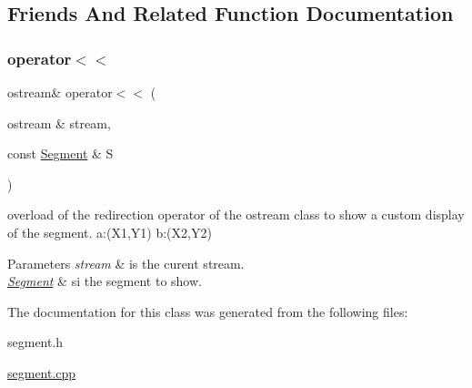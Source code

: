 \subsection{Friends And Related Function Documentation}
\hypertarget{class_segment_a494b19a0304a0778bcfb0303f33aec02}{}\label{class_segment_a494b19a0304a0778bcfb0303f33aec02} 
\subsubsection{\texorpdfstring{operator$<$$<$}{operator<<}}
{\footnotesize\ttfamily ostream\& operator$<$$<$ (\begin{DoxyParamCaption}\item[{ostream \&}]{stream,  }\item[{const \hyperlink{class_segment}{Segment} \&}]{S }\end{DoxyParamCaption})\hspace{0.3cm}{\ttfamily [friend]}}



overload of the redirection operator of the ostream class to show a custom display of the segment. a\+:(\+X1,\+Y1) b\+:(\+X2,\+Y2) 


\begin{DoxyParams}{Parameters}
{\em stream} & is the curent stream. \\
\hline
{\em \hyperlink{class_segment}{Segment}} & si the segment to show. \\
\hline
\end{DoxyParams}


The documentation for this class was generated from the following files\+:\begin{DoxyCompactItemize}
\item 
segment.\+h\item 
\hyperlink{segment_8cpp}{segment.\+cpp}\end{DoxyCompactItemize}
